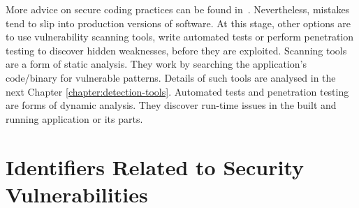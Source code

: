   \bigskip

  More advice on secure coding practices can be found in~\cite{SecureCodingPractices}. Nevertheless, mistakes
  tend to slip into production versions of software. At this stage, other options are to use vulnerability
  scanning tools, write automated tests or perform penetration testing to discover hidden weaknesses, before
  they are exploited. Scanning tools are a form of static analysis. They work by searching the application's code/binary
  for vulnerable patterns. Details of such tools are analysed in the next Chapter \ref{chapter:detection-tools}.
  Automated tests and penetration testing are forms of dynamic analysis. They discover run-time issues
  in the built and running application or its parts.


  \section{Identifiers Related to Security Vulnerabilities}


